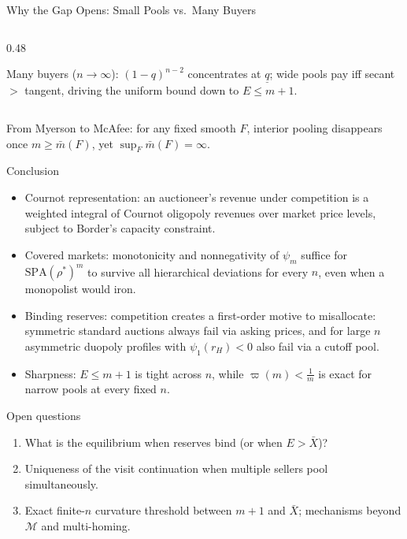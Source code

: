 \documentclass[11pt,aspectratio=169,handout]{beamer}
\def\meditem{\smallskip\item}
\newcommand{\SPA}{\mathrm{SPA}}
\newcommand{\uq}{\underline q}
\begin{document}
\begin{frame}{Why the Gap Opens: Small Pools vs.\ Many Buyers}
\begin{columns}[T]
\begin{column}{0.48\textwidth}
\raggedright\footnotesize
\alert{Many buyers ($n\to\infty$)}: $(1-q)^{n-2}$ concentrates at $\uq$; wide pools pay iff secant $>$ tangent, driving the uniform bound down to $E\le m+1$.
\end{column}
\end{columns}

\medskip{}
\alert{From Myerson to McAfee}: for any fixed smooth $F$, interior pooling disappears once $m\ge\bar m(F)$, yet $\sup_F\bar m(F)=\infty$.
\end{frame}

\begin{frame}{Conclusion}
\begin{itemize}
\item \alert{Cournot representation}: an auctioneer's revenue under competition is a weighted integral of Cournot oligopoly revenues over market price levels, subject to Border's capacity constraint.
\meditem \alert{Covered markets}: monotonicity and nonnegativity of $\psi_m$ suffice for $\SPA(\rho^*)^m$ to survive all hierarchical deviations for every $n$, even when a monopolist would iron.
\meditem \alert{Binding reserves}: competition creates a first-order motive to misallocate: symmetric standard auctions always fail via asking prices, and for large $n$ asymmetric duopoly profiles with $\psi_1(r_H)<0$ also fail via a cutoff pool.
\meditem \alert{Sharpness}: $E\le m+1$ is tight across $n$, while $\varpi(m)<\frac1m$ is exact for narrow pools at every fixed $n$.
\end{itemize}

\begin{block}{Open questions}
\begin{enumerate}
\item What is the equilibrium when reserves bind (or when $E>\bar X$)?
\item Uniqueness of the visit continuation when multiple sellers pool simultaneously.
\item Exact finite-$n$ curvature threshold between $m+1$ and $\bar X$; mechanisms beyond $\mathcal M$ and multi-homing.
\end{enumerate}
\end{block}
\end{frame}

\appendix
\end{document}
